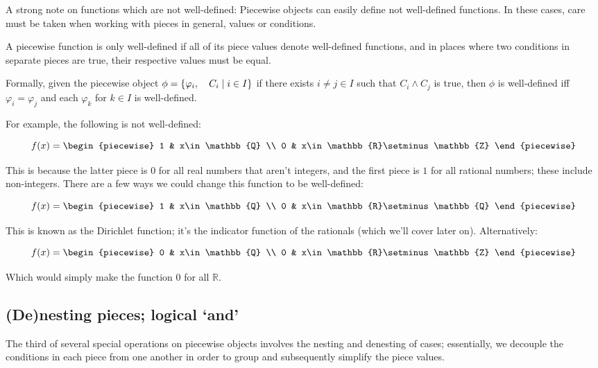A strong note on functions which are not well-defined: Piecewise objects can easily define not well-defined functions. In these cases, care must be taken when working with pieces in general, values or conditions. 

\begin{theorem}
    A piecewise function is only well-defined if all of its piece values denote well-defined functions, and in places where two conditions in separate pieces are true, their respective values must be equal.

    Formally, given the piecewise object $\phi=\{\varphi_i,\quad C_i\mid i\in I\}$ if there exists $i\neq j\in I$ such that $C_i\land C_j$ is true, then $\phi$ is well-defined iff $\varphi_i=\varphi_j$ and each $\varphi_k$ for $k\in I$ is well-defined.

    For example, the following is not well-defined:

    $$
        f(x) = \begin{piecewise}
            1 & x\in\mathbb{Q} \\
            0 & x\in\mathbb{R}\setminus\mathbb{Z}
        \end{piecewise}
    $$

    This is because the latter piece is $0$ for all real numbers that aren't integers, and the first piece is $1$ for all rational numbers; these include non-integers. There are a few ways we could change this function to be well-defined:
    
    $$
        f(x) = \begin{piecewise}
            1 & x\in\mathbb{Q} \\
            0 & x\in\mathbb{R}\setminus\mathbb{Q}
        \end{piecewise}
    $$

    This is known as the Dirichlet function; it's the indicator function of the rationals (which we'll cover later on). Alternatively:

    $$
        f(x) = \begin{piecewise}
            0 & x\in\mathbb{Q} \\
            0 & x\in\mathbb{R}\setminus\mathbb{Z}
        \end{piecewise}
    $$

    Which would simply make the function $0$ for all $\mathbb{R}$.
\end{theorem}

\subsection{(De)nesting pieces; logical `and'}
The third of several special operations on piecewise objects involves the nesting and denesting of cases; essentially, we decouple the conditions in each piece from one another in order to group and subsequently simplify the piece values.

